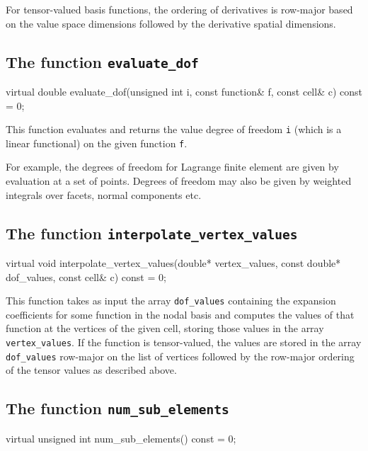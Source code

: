 For tensor-valued basis functions, the ordering of derivatives is
row-major based on the value space dimensions followed by the
derivative spatial dimensions.

\subsection{The function \texttt{evaluate\_dof}}

\begin{code}
virtual double evaluate_dof(unsigned int i,
                            const function& f,
                            const cell& c) const = 0;
\end{code}

This function evaluates and returns the value degree of freedom
\texttt{i} (which is a linear functional) on the given function
\texttt{f}.
  
For example, the degrees of freedom for Lagrange finite element are
given by evaluation at a set of points. Degrees of freedom may also be
given by weighted integrals over facets, normal components etc.

\subsection{The function \texttt{interpolate\_vertex\_values}}

\begin{code}
virtual void interpolate_vertex_values(double* vertex_values,
                                       const double* dof_values,
                                       const cell& c) const = 0;
\end{code}

This function takes as input the array \texttt{dof\_values} containing
the expansion coefficients for some function in the nodal basis and
computes the values of that function at the vertices of the given
cell, storing those values in the array \texttt{vertex\_values}. If
the function is tensor-valued, the values are stored in the array
\texttt{dof\_values} row-major on the list of vertices followed by the
row-major ordering of the tensor values as described above.

\subsection{The function \texttt{num\_sub\_elements}}

\begin{code}
virtual unsigned int num_sub_elements() const = 0;
\end{code}

